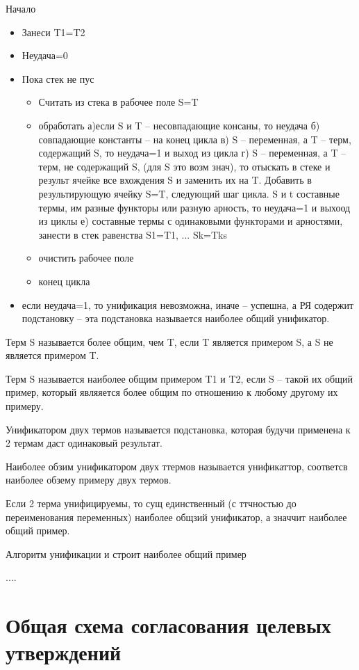 \documentclass[12pt]{report}
\begin{document}
Начало
\begin{itemize}
	\item Занеси T1=T2
	\item Неудача=0
	\item Пока стек не пус
	\begin{itemize}
		\item Считать из стека в рабочее поле S=T
		\item обработать а)если  S и T -- несовпадающие консаны, то неудача
		б) совпадающие константы -- на конец цикла
		в) S -- переменная, а T -- терм, содержащий S, то неудача=1 и выход из цикла
		г) S -- переменная, а T -- терм, не содержащий S, (для S это возм знач), то отыскать в стеке и результ ячейке все  вхождения S и заменить их на T. Добавить в результирующую ячейку S=T, следующий шаг цикла.
		S и t составные термы,  им разные функторы или разную арность, то неудача=1 и выхоод из циклы
		е) составные термы с одинаковыми функторами и арностями, занести в стек равенства S1=T1, ... Sk=Tks
		\item очистить рабочее поле
		\item конец цикла
	\end{itemize}
\item если неудача=1, то унификация невозможна, иначе -- успешна,  а РЯ содержит подстановку -- эта подстановка называется наиболее общий унификатор. 
\end{itemize}

Терм S называется более общим, чем T, если  T является примером S, а S не является примером T.

Терм S называется наиболее общим примером T1 и T2, если S -- такой их общий пример, который являяется более общим по отношению к любому другому их примеру.

Унификатором двух термов называется подстановка, которая будучи применена к 2 термам даст одинаковый результат.

Наиболее обзим унификатором двух ттермов называется унификаттор, соответсв наиболее обзему примеру двух термов.

Если  2 терма унифицируемы, то сущ единственный (с ттчностью до переименования переменных) наиболее общзий унификатор, а значчит наиболее общий пример.

Алгоритм унификации и строит наиболее общий пример

....



\section{Общая схема согласования целевых утверждений}
\end{document}
